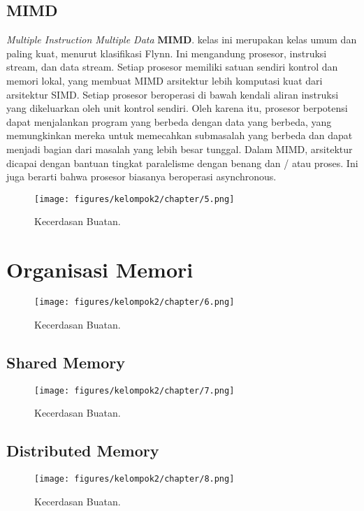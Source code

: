 \subsection{MIMD}
\textit{Multiple Instruction Multiple Data} \textbf{MIMD}. kelas ini merupakan kelas umum dan paling kuat, menurut klasifikasi Flynn. Ini mengandung prosesor, instruksi stream, dan data stream. Setiap prosesor memiliki satuan sendiri kontrol dan memori lokal, yang membuat MIMD arsitektur lebih komputasi kuat dari arsitektur SIMD.
Setiap prosesor beroperasi di bawah kendali aliran instruksi yang dikeluarkan oleh unit kontrol sendiri. Oleh karena itu, prosesor berpotensi dapat menjalankan program yang berbeda dengan data yang berbeda, yang memungkinkan mereka untuk memecahkan submasalah yang berbeda dan dapat menjadi bagian dari masalah yang lebih besar tunggal. Dalam MIMD, arsitektur dicapai dengan bantuan tingkat paralelisme dengan benang dan / atau proses. Ini juga berarti bahwa prosesor biasanya beroperasi asynchronous.


\begin{figure}[H]
	\texttt{[image: figures/kelompok2/chapter/5.png]}
	\centering
	\caption{Kecerdasan Buatan.}
\end{figure}

\section{Organisasi Memori}

\begin{figure}[H]
	\texttt{[image: figures/kelompok2/chapter/6.png]}
	\centering
	\caption{Kecerdasan Buatan.}
\end{figure}

\subsection{Shared Memory}

\begin{figure}[H]
	\texttt{[image: figures/kelompok2/chapter/7.png]}
	\centering
	\caption{Kecerdasan Buatan.}
\end{figure}

\subsection{Distributed Memory}

\begin{figure}[H]
	\texttt{[image: figures/kelompok2/chapter/8.png]}
	\centering
	\caption{Kecerdasan Buatan.}
\end{figure}

